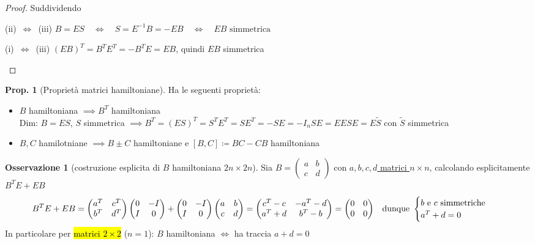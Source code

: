\documentclass[a4paper,10pt]{article}
\theoremstyle{definition}
\theoremstyle{indentdefinition}
\theoremstyle{indenttheorem}
\newtheorem{prop}{Prop.}
\theoremstyle{myremark}
\newtheorem*{rem*}{Osservazione}
\theoremstyle{indentgeneral}
\newenvironment{lyxlist}[1]
	{\begin{list}{}
		{\settowidth{\labelwidth}{#1}
		 \setlength{\leftmargin}{\labelwidth}
		 \addtolength{\leftmargin}{\labelsep}
		 \renewcommand{\makelabel}[1]{##1\hfil}}}
	{\end{list}}
\begin{document}
\begin{proof}
Suddividendo
\begin{lyxlist}{00.00.0000}
\item [{(ii)~$\Leftrightarrow$~(iii)}] $B=ES\quad\Longleftrightarrow\quad S=E^{-1}B=-EB\quad\Longleftrightarrow\quad EB \text{ simmetrica}$
\item [{(i)~$\Leftrightarrow$~(iii)}] $\left(EB\right)^{T}=B^{T}E^{T}=-B^{T}E=EB$,
quindi $EB$ simmetrica
\end{lyxlist}
\end{proof}

\begin{prop}[Proprietà matrici hamiltoniane]
Ha le seguenti proprietà:
\begin{itemize}
    \item $B$ hamiltoniana $\implies B^T$ hamiltoniana \\
    Dim: $B=ES$, $S$ simmetrica $\implies B^T=(ES)^T=S^TE^T=SE^T=-SE=-I_nSE=EESE=E\widetilde{S}$ con $\widetilde{S}$ simmetrica 
    \item $B,C$ hamilotniane $\implies B\pm C$ hamiltoniane e $[B,C]\coloneqq BC-CB$ hamiltoniana
\end{itemize}
\end{prop}

\begin{rem*}[costruzione esplicita di $B$ hamiltoniana $2n\times 2n$]
Sia $B=\begin{pmatrix}a & b\\
c & d
\end{pmatrix}$ con \underline{$a,b,c,d$ matrici $n\times n$}, calcolando esplicitamente $B^{T}E+EB$
\begin{align*}
B^{T}E+EB & =\begin{pmatrix}a^{T} & c^{T}\\
b^{T} & d^{T}
\end{pmatrix}\begin{pmatrix}0 & -I\\
I & 0
\end{pmatrix}+\begin{pmatrix}0 & -I\\
I & 0
\end{pmatrix}\begin{pmatrix}a & b\\
c & d
\end{pmatrix}=\begin{pmatrix}c^{T}-c & -a^{T}-d\\
a^{T}+d & b^{T}-b
\end{pmatrix}=\begin{pmatrix}0 & 0\\
0 & 0
\end{pmatrix} & \text{dunque } & \begin{cases}
\text{\ensuremath{b} e \ensuremath{c} simmetriche}\\
a^{T}+d=0
\end{cases}
\end{align*}
In particolare per \hl{matrici $2\times 2$} ($n=1$): $B$ hamiltoniana $\Longleftrightarrow$
ha traccia $a+d=0$ 
\end{rem*}
\end{document}
